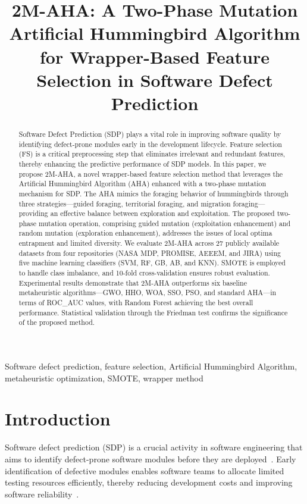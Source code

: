 \documentclass[conference,twocolumn]{IEEEtran}
\title{2M-AHA: A Two-Phase Mutation Artificial Hummingbird Algorithm for Wrapper-Based Feature Selection in Software Defect Prediction}
\author{
\IEEEauthorblockN{Author Name}
\IEEEauthorblockA{Department of Computer Science and Engineering\\
University Name\\
Email: author@university.edu}
}
\begin{document}
\maketitle

\begin{abstract}
Software Defect Prediction (SDP) plays a vital role in improving software quality by identifying defect-prone modules early in the development lifecycle. Feature selection (FS) is a critical preprocessing step that eliminates irrelevant and redundant features, thereby enhancing the predictive performance of SDP models. In this paper, we propose 2M-AHA, a novel wrapper-based feature selection method that leverages the Artificial Hummingbird Algorithm (AHA) enhanced with a two-phase mutation mechanism for SDP. The AHA mimics the foraging behavior of hummingbirds through three strategies---guided foraging, territorial foraging, and migration foraging---providing an effective balance between exploration and exploitation. The proposed two-phase mutation operation, comprising guided mutation (exploitation enhancement) and random mutation (exploration enhancement), addresses the issues of local optima entrapment and limited diversity. We evaluate 2M-AHA across 27 publicly available datasets from four repositories (NASA MDP, PROMISE, AEEEM, and JIRA) using five machine learning classifiers (SVM, RF, GB, AB, and KNN). SMOTE is employed to handle class imbalance, and 10-fold cross-validation ensures robust evaluation. Experimental results demonstrate that 2M-AHA outperforms six baseline metaheuristic algorithms---GWO, HHO, WOA, SSO, PSO, and standard AHA---in terms of ROC\_AUC values, with Random Forest achieving the best overall performance. Statistical validation through the Friedman test confirms the significance of the proposed method.
\end{abstract}

\begin{IEEEkeywords}
Software defect prediction, feature selection, Artificial Hummingbird Algorithm, metaheuristic optimization, SMOTE, wrapper method
\end{IEEEkeywords}

\section{Introduction}

Software defect prediction (SDP) is a crucial activity in software engineering that aims to identify defect-prone software modules before they are deployed~\cite{hall2012systematic}. Early identification of defective modules enables software teams to allocate limited testing resources efficiently, thereby reducing development costs and improving software reliability~\cite{kamei2013large}.
\end{document}
